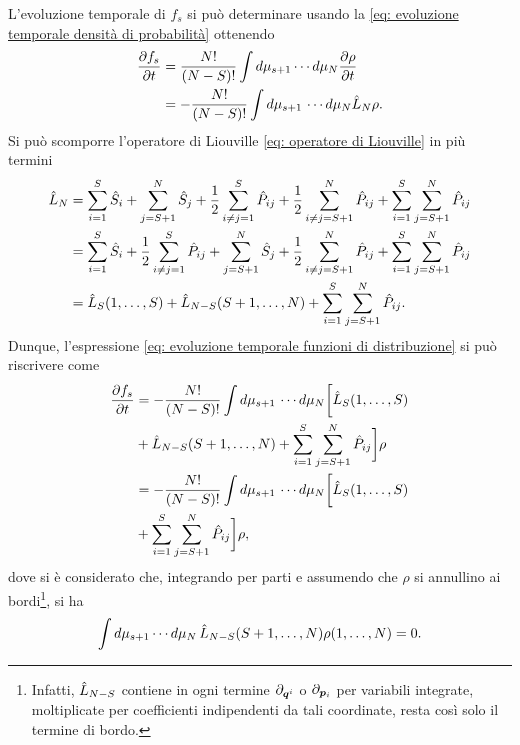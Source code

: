 L'evoluzione temporale di $f_s$ si può determinare usando la \eqref{eq: evoluzione temporale densità di probabilità} ottenendo
\begin{equation}
\label{eq: evoluzione temporale funzioni di distribuzione}
    \begin{split}
        \frac{\partial f_s}{\partial t} &= \frac{N!}{(N-S)!}\int d\mu_{s+1}\cdots d\mu_N\frac{\partial\rho}{\partial t} \\
        &= -\frac{N!}{(N-S)!}\int d\mu_{s+1}\,\cdots d\mu_N\hat{L}_N\rho.
    \end{split}
\end{equation}
Si può scomporre l'operatore di Liouville \eqref{eq: operatore di Liouville} in più termini
\begin{equation}
    \begin{split}
        \hat{L}_N &= \sum_{i=1}^S\hat{S}_i + \sum_{j=S+1}^N\hat{S}_j + \frac{1}{2}\sum_{i\neq j=1}^S\hat{P}_{ij} + \frac{1}{2}\sum_{i\neq j=S+1}^N\hat{P}_{ij} + \sum_{i=1}^S\sum_{j=S+1}^N\hat{P}_{ij} \\
        &= \sum_{i=1}^S\hat{S}_i + \frac{1}{2}\sum_{i\neq j=1}^S\hat{P}_{ij} + \sum_{j=S+1}^N\hat{S}_j + \frac{1}{2}\sum_{i\neq j=S+1}^N\hat{P}_{ij} + \sum_{i=1}^S\sum_{j=S+1}^N\hat{P}_{ij} \\
        &= \hat{L}_S(1,\dots,S) + \hat{L}_{N-S}(S+1,\dots,N) + \sum_{i=1}^S\sum_{j=S+1}^N\hat{P}_{ij}.
    \end{split}
\end{equation}
Dunque, l'espressione \eqref{eq: evoluzione temporale funzioni di distribuzione} si può riscrivere come
\begin{equation}
    \begin{split}
        \frac{\partial f_s}{\partial t} &= -\frac{N!}{(N-S)!}\int d\mu_{s+1}\,\cdots d\mu_N\bigg[\hat{L}_S(1,\dots,S) \\
        &+ \hat{L}_{N-S}(S+1,\dots,N) + \sum_{i=1}^S\sum_{j=S+1}^N\hat{P}_{ij}\bigg]\rho \\
        &= -\frac{N!}{(N-S)!}\int d\mu_{s+1}\,\cdots d\mu_N\bigg[\hat{L}_S(1,\dots,S) \\
        &+ \sum_{i=1}^S\sum_{j=S+1}^N\hat{P}_{ij}\bigg]\rho,
    \end{split}
\end{equation}
dove si è considerato che, integrando per parti e assumendo che $\rho$ si annullino ai bordi\footnote{Infatti, $\hat{L}_{N-S}$ contiene in ogni termine $\partial_{\bm{q}^i}$ o $\partial_{\bm{p}_i}$ per variabili integrate, moltiplicate per coefficienti indipendenti da tali coordinate, resta così solo il termine di bordo.}, si ha 
\begin{equation}
    \int d\mu_{s+1}\cdots d\mu_N\,\hat{L}_{N-S}(S+1,\dots,N)\rho(1,\dots,N) = 0.
\end{equation}
